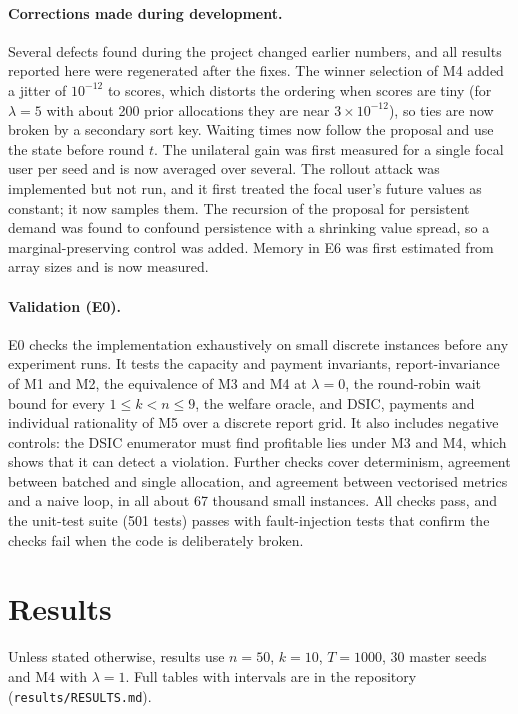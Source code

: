 \documentclass{article}
\theoremstyle{plain}
\theoremstyle{definition}
\begin{document}
\paragraph{Corrections made during development.}
Several defects found during the project changed earlier numbers, and all results reported here were regenerated after the fixes.
The winner selection of M4 added a jitter of $10^{-12}$ to scores, which distorts the ordering when scores are tiny (for $\lambda=5$ with about 200 prior allocations they are near $3\times 10^{-12}$), so ties are now broken by a secondary sort key.
Waiting times now follow the proposal and use the state before round $t$.
The unilateral gain was first measured for a single focal user per seed and is now averaged over several.
The rollout attack was implemented but not run, and it first treated the focal user's future values as constant; it now samples them.
The recursion of the proposal for persistent demand was found to confound persistence with a shrinking value spread, so a marginal-preserving control was added.
Memory in E6 was first estimated from array sizes and is now measured.

\paragraph{Validation (E0).}
E0 checks the implementation exhaustively on small discrete instances before any experiment runs.
It tests the capacity and payment invariants, report-invariance of M1 and M2, the equivalence of M3 and M4 at $\lambda=0$, the round-robin wait bound for every $1\le k<n\le 9$, the welfare oracle, and DSIC, payments and individual rationality of M5 over a discrete report grid.
It also includes negative controls: the DSIC enumerator must find profitable lies under M3 and M4, which shows that it can detect a violation.
Further checks cover determinism, agreement between batched and single allocation, and agreement between vectorised metrics and a naive loop, in all about 67 thousand small instances.
All checks pass, and the unit-test suite (501 tests) passes with fault-injection tests that confirm the checks fail when the code is deliberately broken.

\section{Results}
\label{sec:results}

Unless stated otherwise, results use $n=50$, $k=10$, $T=1000$, 30 master seeds and M4 with $\lambda=1$.
Full tables with intervals are in the repository (\texttt{results/RESULTS.md}).
\end{document}
